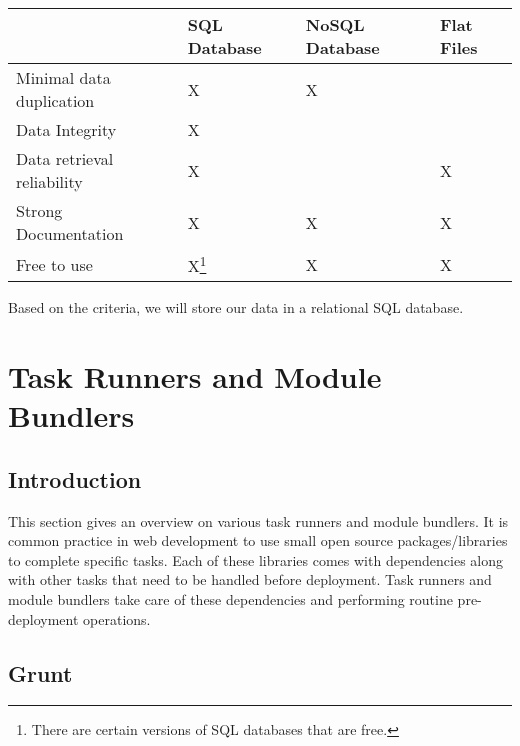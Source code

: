 \documentclass[draftclsnofoot,onecolumn,letterpaper,10pt,compsoc]{IEEEtran}
\begin{document}
		        \begin{center}
		            \begin{tabular}{| m{15em} | m{10em} | m{10em} | m{10em} |}
		                \hline
		                    & SQL Database & NoSQL Database & Flat Files \\

		                \hline
		                    Minimal data duplication & X & X & \\

		                \hline
		                    Data Integrity & X &  &  \\

		                \hline
		                    Data retrieval reliability & X &  & X \\

		                \hline
		                    Strong Documentation & X & X & X \\

		                \hline
		                    Free to use & X\footnote{There are certain versions of SQL databases that are free.} & X & X \\

		                \hline
		            \end{tabular}
		        \end{center}

		        Based on the criteria, we will store our data in a relational SQL database.

		\section{Task Runners and Module Bundlers}
		    \subsection{Introduction}
		        This section gives an overview on various task runners and module bundlers.
		        It is common practice in web development to use small open source packages/libraries to complete specific tasks.
		        Each of these libraries comes with dependencies along with other tasks that need to be handled before deployment.
		        Task runners and module bundlers take care of these dependencies and performing routine pre-deployment operations.

			\subsection{Grunt}
\end{document}
